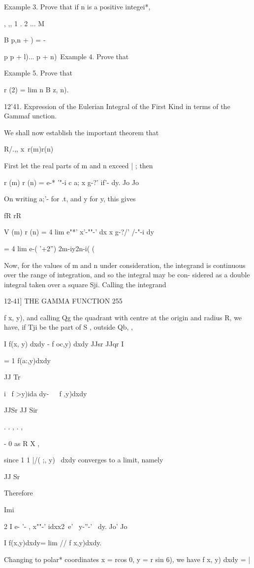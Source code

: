 Example 3. Prove that if n is a positive integei*,

 , ,, 1 . 2 ... M

B p,n + ) = -

p p + l)... p + n)\ Example 4. Prove that

Example 5. Prove that

r (2) = lim n B z, n).

12'41. Expression of the Eulerian Integral of the First Kind in terms
of the Gammaf unction.

We shall now establish the important theorem that

R/.,, x\ r(m)r(n)

First let the real parts of m and n exceed | ; then

r (m) r (n) = e-* '"-i c a; x g-?' if'- dy. Jo Jo

On writing a;'- for .t, and y for y, this gives

fR rR

V (m) r (n) = 4 lim e"*' x'-""-' dx x g-?/' /-"-i dy

= 4 lim e-( '+2'') 2m-iy2n-i( ( \

Now, for the values of m and n under consideration, the integrand is
continuous over the range of integration, and so the integral may be
con- sidered as a double integral taken over a square Sji. Calling the
integrand

12-41] THE GAMMA FUNCTION 255

f x, y), and calling Qg the quadrant with centre at the origin and
radius R, we have, if Tji be the part of S , outside Qb, ,

I f(x, y) dxdy - f oc,y) dxdy JJsr JJqr I

= 1 f(a:,y)dxdy

 JJ Tr

i \ f >y)ida dy-\ \ \ f ,y)dxdy\

JJSr JJ Sir

  . . , . ,

- 0 as R X ,

since 1 1 |/( ;, y) \ dxdy converges to a limit, namely

JJ Sr

Therefore

Imi

2 I e- '- , x""-' idxx2\ e' \ y-''-' \ dy. Jo' Jo

I f(x,y)dxdy= lim // f x,y)dxdy.

Changing to polar* coordinates x = rcos 0, y = r sin 6), we have f x,
y) dxdy = |

